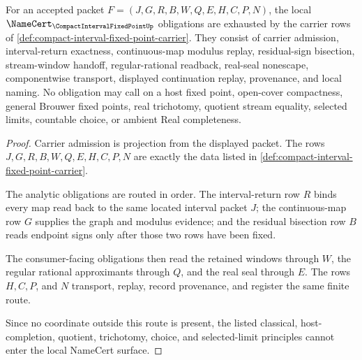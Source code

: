 \begin{theorem}
\label{thm:compact-interval-fixed-point-namecert-obligations}
For an accepted packet $F=(J,G,R,B,W,Q,E,H,C,P,N)$, the local $\NameCert_{\CompactIntervalFixedPointUp}$ obligations are exhausted by the carrier rows of \autoref{def:compact-interval-fixed-point-carrier}. They consist of carrier admission, interval-return exactness, continuous-map modulus replay, residual-sign bisection, stream-window handoff, regular-rational readback, real-seal nonescape, componentwise transport, displayed continuation replay, provenance, and local naming. No obligation may call on a host fixed point, open-cover compactness, general Brouwer fixed points, real trichotomy, quotient stream equality, selected limits, countable choice, or ambient Real completeness.
\end{theorem}
\begin{proof}
Carrier admission is projection from the displayed packet. The rows $J,G,R,B,W,Q,E,H,C,P,N$ are exactly the data listed in \autoref{def:compact-interval-fixed-point-carrier}.

The analytic obligations are routed in order. The interval-return row $R$ binds every map read back to the same located interval packet $J$; the continuous-map row $G$ supplies the graph and modulus evidence; and the residual bisection row $B$ reads endpoint signs only after those two rows have been fixed.

The consumer-facing obligations then read the retained windows through $W$, the regular rational approximants through $Q$, and the real seal through $E$. The rows $H,C,P$, and $N$ transport, replay, record provenance, and register the same finite route.

Since no coordinate outside this route is present, the listed classical, host-completion, quotient, trichotomy, choice, and selected-limit principles cannot enter the local NameCert surface.
\end{proof}

